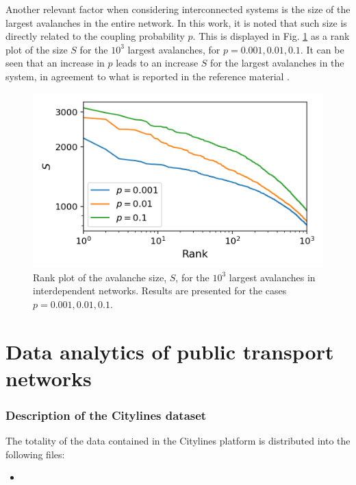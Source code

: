 Another relevant factor when considering interconnected systems is the size of the largest avalanches in the entire network. In this work, it is noted that such size is directly related to the coupling probability $p$. This is displayed in Fig. \ref{fig:SM_large_avalanche_rank_plot_joint_AB} as a rank plot of the size $S$ for the $10^3$ largest avalanches, for $p=0.001, 0.01, 0.1$. It can be seen that an increase in $p$ leads to an increase $S$ for the largest avalanches in the system, in agreement to what is reported in the reference material \cite{brummitt2012suppressing}.


\begin{figure}[!h]
	\begin{center}
	\includegraphics[scale=0.75]{./images/task_15/SM_large_avalanche_rank_plot_joint_AB.png} 
	\end{center}
	\caption{Rank plot of the avalanche size, $S$, for the $10^3$ largest avalanches in interdependent networks. Results are presented for the cases $p=0.001, 0.01, 0.1$. \\} 
	\label{fig:SM_large_avalanche_rank_plot_joint_AB} 
\end{figure}



\section{Data analytics of public transport networks}
\label{sec:DATN_SM}

\subsubsection*{Description of the Citylines dataset}
The totality of the data contained in the Citylines platform is distributed into the following files:
\begin{itemize}
	\item 
\end{itemize}


\newpage
